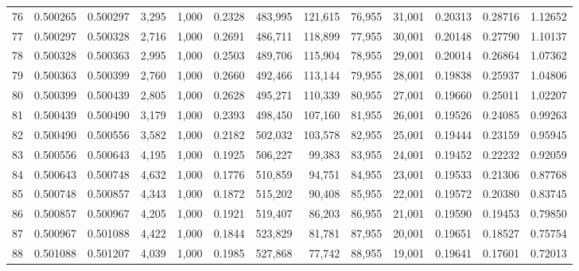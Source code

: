 \begin{tabular}{rrrrrrrrrrrrr}
76  &  0.500265 &  0.500297 &  3,295 &  1,000 &                                     0.2328 &  483,995 &  121,615 &   76,955 &   31,001 &  0.20313 &  0.28716 &  1.12652 \\
77  &  0.500297 &  0.500328 &  2,716 &  1,000 &                                     0.2691 &  486,711 &  118,899 &   77,955 &   30,001 &  0.20148 &  0.27790 &  1.10137 \\
78  &  0.500328 &  0.500363 &  2,995 &  1,000 &                                     0.2503 &  489,706 &  115,904 &   78,955 &   29,001 &  0.20014 &  0.26864 &  1.07362 \\
79  &  0.500363 &  0.500399 &  2,760 &  1,000 &                                     0.2660 &  492,466 &  113,144 &   79,955 &   28,001 &  0.19838 &  0.25937 &  1.04806 \\
80  &  0.500399 &  0.500439 &  2,805 &  1,000 &                                     0.2628 &  495,271 &  110,339 &   80,955 &   27,001 &  0.19660 &  0.25011 &  1.02207 \\
81  &  0.500439 &  0.500490 &  3,179 &  1,000 &                                     0.2393 &  498,450 &  107,160 &   81,955 &   26,001 &  0.19526 &  0.24085 &  0.99263 \\
82  &  0.500490 &  0.500556 &  3,582 &  1,000 &                                     0.2182 &  502,032 &  103,578 &   82,955 &   25,001 &  0.19444 &  0.23159 &  0.95945 \\
83  &  0.500556 &  0.500643 &  4,195 &  1,000 &                                     0.1925 &  506,227 &   99,383 &   83,955 &   24,001 &  0.19452 &  0.22232 &  0.92059 \\
84  &  0.500643 &  0.500748 &  4,632 &  1,000 &                                     0.1776 &  510,859 &   94,751 &   84,955 &   23,001 &  0.19533 &  0.21306 &  0.87768 \\
85  &  0.500748 &  0.500857 &  4,343 &  1,000 &                                     0.1872 &  515,202 &   90,408 &   85,955 &   22,001 &  0.19572 &  0.20380 &  0.83745 \\
86  &  0.500857 &  0.500967 &  4,205 &  1,000 &                                     0.1921 &  519,407 &   86,203 &   86,955 &   21,001 &  0.19590 &  0.19453 &  0.79850 \\
87  &  0.500967 &  0.501088 &  4,422 &  1,000 &                                     0.1844 &  523,829 &   81,781 &   87,955 &   20,001 &  0.19651 &  0.18527 &  0.75754 \\
88  &  0.501088 &  0.501207 &  4,039 &  1,000 &                                     0.1985 &  527,868 &   77,742 &   88,955 &   19,001 &  0.19641 &  0.17601 &  0.72013 \\

\end{tabular}
